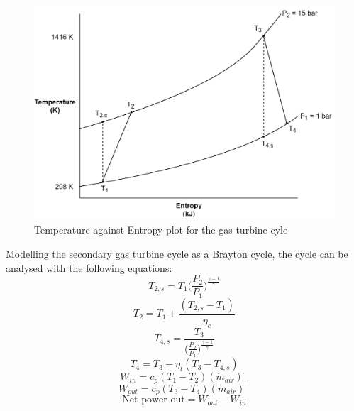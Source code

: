 \begin{figure}[h!]
    \centering
    \includegraphics[scale=0.9]{TSplot.png}
    \caption{Temperature against Entropy plot for the gas turbine cyle}
    \label{LMfig:TSplot}
\end{figure}
Modelling the secondary gas turbine cycle as a Brayton cycle, the cycle can be analysed with the following equations:
\begin{equation}
T_{2,s}= T_1 \Big (\frac{P_2}{P_1} \Big )^{\frac{\gamma-1}{\gamma}}					
\end{equation}
\begin{equation}
T_2= T_1+  \frac{(T_{2,s}- T_1)}{\eta_c} 					
\end{equation}
\begin{equation}
T_{4,s}=\frac{T_3}{\Big (\frac{P_2}{P_1} \Big )^{\frac{\gamma-1}{\gamma}}} 			
\end{equation}
\begin{equation}
T_4= T_3- \eta_t (T_3- T_{4,s})				
\end{equation}
\begin{equation}
W_{in} = c_p (T_1- T_2)(\dot m_{air} ) ̇				
\end{equation}
\begin{equation}
W_{out} = c_p (T_3- T_4)(\dot m_{air} ) ̇				
\end{equation}
\begin{equation}
\text {Net power out}=W_{out} - W_{in}		
\end{equation}
